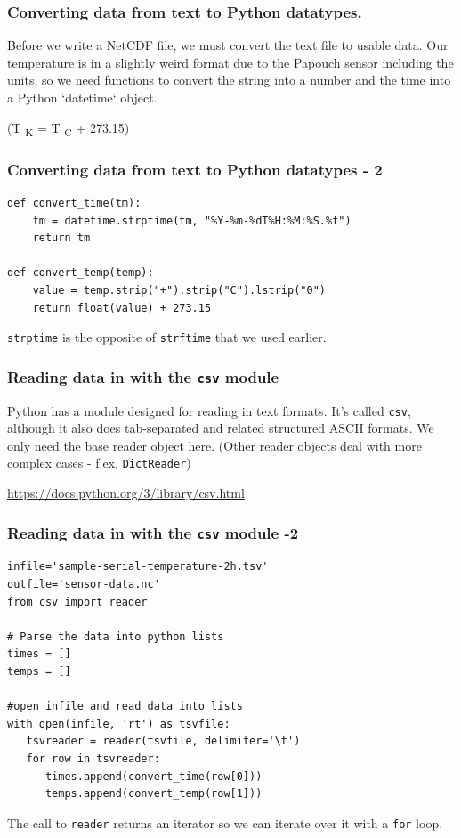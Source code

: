 \documentclass[aspectratio=1610,9pt]{beamer} %
\begin{document}
\begin{frame}
\frametitle{Converting data from text to Python
datatypes.}

Before we write a NetCDF file, we must convert the text file to usable
data. Our temperature is in a slightly weird format due to the Papouch
sensor including the units, so we need functions to convert the string
into a number and the time into a Python `datetime` object.

(T \textsubscript{K} = T \textsubscript{C} + 273.15)

\end{frame}
\begin{frame}[fragile]
\frametitle{Converting data from text to Python datatypes -
2}

\begin{verbatim}
def convert_time(tm):
    tm = datetime.strptime(tm, "%Y-%m-%dT%H:%M:%S.%f")
    return tm

def convert_temp(temp):
    value = temp.strip("+").strip("C").lstrip("0")
    return float(value) + 273.15
\end{verbatim}

\texttt{strptime} is the opposite of \texttt{strftime} that we used
earlier.

\end{frame}
\begin{frame}
\frametitle{Reading data in with the \texttt{csv}
module}

Python has a module designed for reading in text formats. It's called
\texttt{csv}, although it also does tab-separated and related structured
ASCII formats. We only need the base reader object here. (Other reader
objects deal with more complex cases - f.ex. \texttt{DictReader})

\url{https://docs.python.org/3/library/csv.html}

\end{frame}
\begin{frame}[fragile]
\frametitle{Reading data in with the \texttt{csv} module
-2}

\begin{verbatim}
infile='sample-serial-temperature-2h.tsv'
outfile='sensor-data.nc'
from csv import reader

# Parse the data into python lists
times = []
temps = []

#open infile and read data into lists
with open(infile, 'rt') as tsvfile:
   tsvreader = reader(tsvfile, delimiter='\t')
   for row in tsvreader:
      times.append(convert_time(row[0]))
      temps.append(convert_temp(row[1]))
\end{verbatim}

The call to \texttt{reader} returns an iterator so we can iterate over
it with a \texttt{for} loop.

\end{frame}
\end{document}
